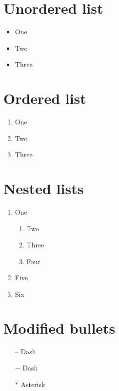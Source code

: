 \documentclass{article}
\begin{document}
\section{Unordered list}
\begin{itemize}
	\item One
	\item Two
	\item Three
\end{itemize}

\section{Ordered list}
\begin{enumerate}
    \item One
    \item Two
    \item Three
\end{enumerate}

\section{Nested lists}
\begin{enumerate}
	 \item One
    	\begin{enumerate}
        		\item Two
      		  \item Three
       		 \item Four
   	 \end{enumerate}
    	\item Five
    	\item Six
\end{enumerate}

\section{Modified bullets}


\begin{itemize}
    \item[--] Dash
    \item[$-$] Dash
    \item[$\ast$] Asterisk
\end{itemize}
\end{document}
